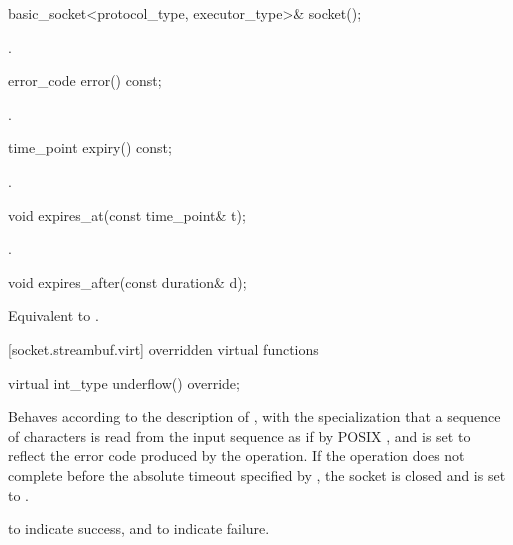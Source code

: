 \begin{itemdecl}
basic_socket<protocol_type, executor_type>& socket();
\end{itemdecl}

\begin{itemdescr}
\pnum
\returns {}.
\end{itemdescr}

\begin{itemdecl}
error_code error() const;
\end{itemdecl}

\begin{itemdescr}
\pnum
\returns {}.
\end{itemdescr}

\begin{itemdecl}
time_point expiry() const;
\end{itemdecl}

\begin{itemdescr}
\pnum
\returns {}.
\end{itemdescr}

\begin{itemdecl}
void expires_at(const time_point& t);
\end{itemdecl}

\begin{itemdescr}
\pnum
\postconditions {}.
\end{itemdescr}

\begin{itemdecl}
void expires_after(const duration& d);
\end{itemdecl}

\begin{itemdescr}
\pnum
\effects Equivalent to .
\end{itemdescr}



[socket.streambuf.virt]{ overridden virtual functions}

\begin{itemdecl}
virtual int_type underflow() override;
\end{itemdecl}

\begin{itemdescr}
\pnum
\effects Behaves according to the description of , with the specialization that a sequence of characters is read from the input sequence as if by POSIX , and  is set to reflect the error code produced by the operation. If the operation does not complete before the absolute timeout specified by , the socket is closed and  is set to .

\pnum
\returns {} to indicate success,
and  to indicate failure.
\end{itemdescr}

